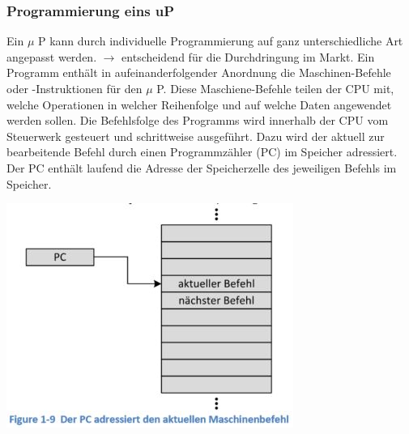\subsubsection{Programmierung eins uP}
\begin{multicols}{2}
\begin{minipage}{\linewidth}
    Ein $\mu$ P kann durch individuelle Programmierung auf ganz unterschiedliche Art angepasst werden. \newline
    $\rightarrow$ entscheidend für die Durchdringung im Markt.\newline
    Ein Programm enthält in aufeinanderfolgender Anordnung die Maschinen-Befehle oder -Instruktionen für den $\mu$ P. Diese Maschiene-Befehle teilen der CPU mit, welche Operationen in welcher Reihenfolge und auf welche Daten angewendet werden sollen. \newline
    Die Befehlsfolge des Programms wird innerhalb der CPU vom Steuerwerk gesteuert und schrittweise ausgeführt. Dazu wird der aktuell zur bearbeitende Befehl durch einen Programmzähler (PC) im Speicher adressiert.\newline
    Der PC enthält laufend die Adresse der Speicherzelle des jeweiligen Befehls im Speicher.
\end{minipage}

\includegraphics[width=\linewidth]{images/uPPC}
\end{multicols}
    
